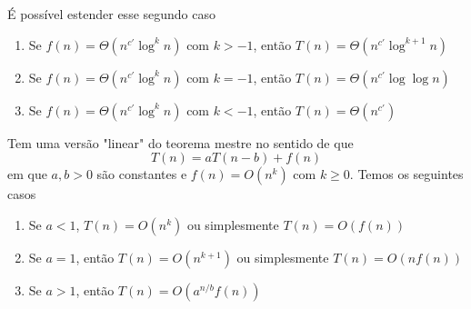 É possível estender esse segundo caso

\begin{enumerate}
    \item Se $f(n) = \Theta(n^{c'} \log^k n)$ com $k>-1$, então $T(n) = \Theta(n^{c'} \log^{k+1} n)$
    \item Se $f(n) = \Theta(n^{c'} \log^k n)$ com $k=-1$, então $T(n) = \Theta(n^{c'} \log \log n)$
    \item Se $f(n) = \Theta(n^{c'} \log^k n)$ com $k < -1$, então $T(n) = \Theta(n^{c'})$
\end{enumerate}

Tem uma versão "linear" do teorema mestre no sentido de que
$$T(n) = aT(n-b) + f(n)$$
em que $a, b > 0$ são constantes e $f(n) = O(n^k)$ com $k \geq 0$. Temos os seguintes casos

\begin{enumerate}
    \item Se $a < 1$, $T(n) = O(n^k)$ ou simplesmente $T(n) = O(f(n))$
    \item Se $a=1$, então $T(n) = O(n^{k+1})$ ou simplesmente $T(n) = O(n f(n))$
    \item Se $a > 1$, então $T(n) = O(a^{n/b} f(n))$
\end{enumerate}
